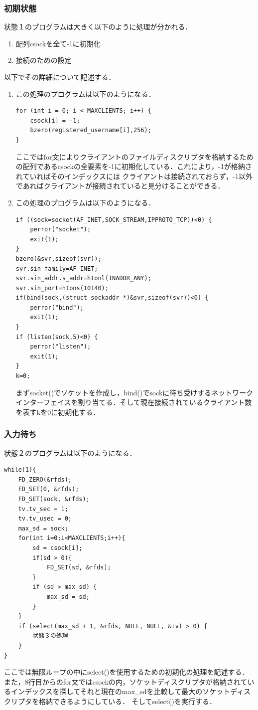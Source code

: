 \documentclass[dvipdfmx]{jarticle}
\begin{document}
\subsubsection{初期状態}
状態１のプログラムは大きく以下のように処理が分かれる．
\begin{enumerate}
    \item 配列csockを全て-1に初期化
    \item 接続のための設定
\end{enumerate}
以下でその詳細について記述する．
\begin{enumerate}
    \item この処理のプログラムは以下のようになる．
    \begin{lstlisting}
for (int i = 0; i < MAXCLIENTS; i++) {
    csock[i] = -1;
    bzero(registered_username[i],256);
} 
    \end{lstlisting}
    ここではfor文によりクライアントのファイルディスクリプタを格納するための配列であるcsockの全要素を-1に初期化している．これにより，-1が格納されていればそのインデックスには
    クライアントは接続されておらず，-1以外であればクライアントが接続されていると見分けることができる．
    \item この処理のプログラムは以下のようになる．
    \begin{lstlisting}
if ((sock=socket(AF_INET,SOCK_STREAM,IPPROTO_TCP))<0) {
    perror("socket");
    exit(1);
}
bzero(&svr,sizeof(svr));
svr.sin_family=AF_INET;
svr.sin_addr.s_addr=htonl(INADDR_ANY);
svr.sin_port=htons(10140);
if(bind(sock,(struct sockaddr *)&svr,sizeof(svr))<0) {
    perror("bind");
    exit(1);
}
if (listen(sock,5)<0) {
    perror("listen");
    exit(1);
}
k=0;
    \end{lstlisting}
    まずsocket()でソケットを作成し，bind()でsockに待ち受けするネットワークインターフェイスを割り当てる．そして現在接続されているクライアント数を表すkを0に初期化する．
\end{enumerate}
\subsubsection{入力待ち}
状態２のプログラムは以下のようになる．
\begin{lstlisting}
while(1){
    FD_ZERO(&rfds);
    FD_SET(0, &rfds);
    FD_SET(sock, &rfds);
    tv.tv_sec = 1;
    tv.tv_usec = 0;
    max_sd = sock;
    for(int i=0;i<MAXCLIENTS;i++){
        sd = csock[i];
        if(sd > 0){
            FD_SET(sd, &rfds);
        }
        if (sd > max_sd) {
            max_sd = sd;
        }
    }
    if (select(max_sd + 1, &rfds, NULL, NULL, &tv) > 0) {
        状態３の処理
    }            
}
\end{lstlisting}
ここでは無限ループの中にselect()を使用するための初期化の処理を記述する．また，8行目からのfor文ではcsockの内，ソケットディスクリプタが格納されているインデックスを探してそれと現在のmax\_sdを比較して最大のソケットディスクリプタを格納できるようにしている．
そしてselect()を実行する．
\end{document}

